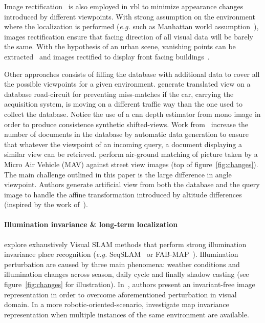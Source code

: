 			Image rectification~\citep{Forstner2016} is also employed in \ac{vbl} to minimize appearance changes introduced by different viewpoints. With strong assumption on the environment where the localization is performed (\textit{e.g.} such as Manhattan world assumption~\citep{Murillo2013,Cham2010}), images rectification ensure that facing direction of all visual data will be barely the same. With the hypothesis of an urban scene, vanishing points can be extracted~\citep{Lezama2014,Hartley2003,Forstner2016} and images rectified to display front facing buildings~\citep{Robertson2004,Chen2011,Morago2016,Arth2015,Cham2010}.
			
			Other approaches consists of filling the database with additional data to cover all the possible viewpoints for a given environment. \citet{Milford2015} generate translated view on a database road-circuit for preventing miss-matches if the car, carrying the acquisition system, is moving on a different traffic way than the one used to collect the database. Notice the use of a \ac{cnn} depth estimator from mono image in order to produce consistence synthetic shifted-views. Work from~\citep{Irschara2009,Aubry2014,Torii2015} increase the number of documents in the database by automatic data generation to ensure that whatever the viewpoint of an incoming query, a document displaying a similar view can be retrieved. \citet{Majdik2013} perform air-ground matching of picture taken by a Micro Air Vehicle (MAV) against street view images (top of figure~\ref{fig:changes}). The main challenge outlined in this paper is the large difference in angle viewpoint. Authors generate artificial view from both the database and the query image to handle the affine transformation introduced by altitude differences (inspired by the work of~\citep{Morel2009}).			
			
		\paragraph{Illumination invariance \& long-term localization}
        	\label{para:illum}
			\citet[Section VII]{Lowry2016} explore exhaustively Visual SLAM methods that perform strong illumination invariance place recognition (\textit{e.g.} SeqSLAM~\citep{Milford2012,Pepperell2014,Pepperell2016} or FAB-MAP~\citep{Cummins2008,Cummins2010,Paul2010}). Illumination perturbation are caused by three main phenomena: weather conditions and illumination changes across season, daily cycle and finally shadow casting (see figure~\ref{fig:changes} for illustration). In~\citep{Lowry2016a}, authors present an invariant-free image representation in order to overcome aforementioned perturbation in visual domain. In a more robotic-oriented-scenario, \citet{Muhlfellner2015} investigate map invariance representation when multiple instances of the same environment are available. 
		
